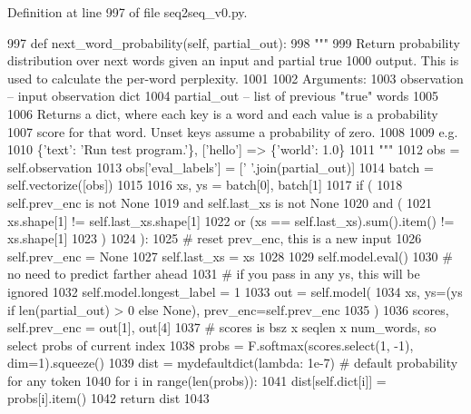 Definition at line 997 of file seq2seq\+\_\+v0.\+py.


\begin{DoxyCode}
997     \textcolor{keyword}{def }next\_word\_probability(self, partial\_out):
998         \textcolor{stringliteral}{"""}
999 \textcolor{stringliteral}{        Return probability distribution over next words given an input and partial true}
1000 \textcolor{stringliteral}{        output. This is used to calculate the per-word perplexity.}
1001 \textcolor{stringliteral}{}
1002 \textcolor{stringliteral}{        Arguments:}
1003 \textcolor{stringliteral}{        observation -- input observation dict}
1004 \textcolor{stringliteral}{        partial\_out -- list of previous "true" words}
1005 \textcolor{stringliteral}{}
1006 \textcolor{stringliteral}{        Returns a dict, where each key is a word and each value is a probability}
1007 \textcolor{stringliteral}{        score for that word. Unset keys assume a probability of zero.}
1008 \textcolor{stringliteral}{}
1009 \textcolor{stringliteral}{        e.g.}
1010 \textcolor{stringliteral}{        \{'text': 'Run test program.'\}, ['hello'] => \{'world': 1.0\}}
1011 \textcolor{stringliteral}{        """}
1012         obs = self.observation
1013         obs[\textcolor{stringliteral}{'eval\_labels'}] = [\textcolor{stringliteral}{' '}.join(partial\_out)]
1014         batch = self.vectorize([obs])
1015 
1016         xs, ys = batch[0], batch[1]
1017         \textcolor{keywordflow}{if} (
1018             self.prev\_enc \textcolor{keywordflow}{is} \textcolor{keywordflow}{not} \textcolor{keywordtype}{None}
1019             \textcolor{keywordflow}{and} self.last\_xs \textcolor{keywordflow}{is} \textcolor{keywordflow}{not} \textcolor{keywordtype}{None}
1020             \textcolor{keywordflow}{and} (
1021                 xs.shape[1] != self.last\_xs.shape[1]
1022                 \textcolor{keywordflow}{or} (xs == self.last\_xs).sum().item() != xs.shape[1]
1023             )
1024         ):
1025             \textcolor{comment}{# reset prev\_enc, this is a new input}
1026             self.prev\_enc = \textcolor{keywordtype}{None}
1027         self.last\_xs = xs
1028 
1029         self.model.eval()
1030         \textcolor{comment}{# no need to predict farther ahead}
1031         \textcolor{comment}{# if you pass in any ys, this will be ignored}
1032         self.model.longest\_label = 1
1033         out = self.model(
1034             xs, ys=(ys \textcolor{keywordflow}{if} len(partial\_out) > 0 \textcolor{keywordflow}{else} \textcolor{keywordtype}{None}), prev\_enc=self.prev\_enc
1035         )
1036         scores, self.prev\_enc = out[1], out[4]
1037         \textcolor{comment}{# scores is bsz x seqlen x num\_words, so select probs of current index}
1038         probs = F.softmax(scores.select(1, -1), dim=1).squeeze()
1039         dist = mydefaultdict(\textcolor{keyword}{lambda}: 1e-7)  \textcolor{comment}{# default probability for any token}
1040         \textcolor{keywordflow}{for} i \textcolor{keywordflow}{in} range(len(probs)):
1041             dist[self.dict[i]] = probs[i].item()
1042         \textcolor{keywordflow}{return} dist
1043 \end{DoxyCode}


